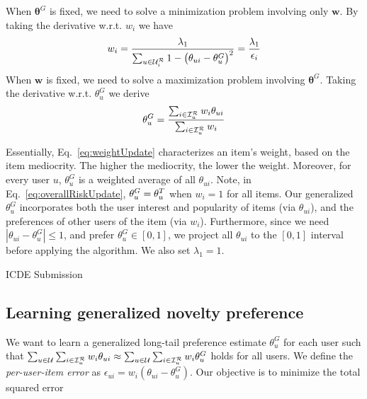 When $\bm{\theta}^G$ is fixed, we need to solve a minimization problem involving only $\mathbf{w}$. By taking the derivative w.r.t. $w_i$ we have  
\begin{align}
w_i = \frac{\lambda_1}{ \sum_{u \in \mathcal{U}_{i}^{\mathcal{R}}} 1 - \big(\theta_{ui} -\theta_u^G\big)^2  } = \frac{\lambda_1}{\epsilon_i}
\label{eq:weightUpdate}
\end{align}
When $\mathbf{w}$ is fixed, we need to solve a maximization problem involving $\bm{\theta}^G$. Taking the derivative w.r.t. $\theta_u^G$ we derive
\begin{align}
\theta_u^G =\frac{\sum_{i \in \mathcal{I}_{u}^{\mathcal{R}}} w_i \theta_{ui}}{\sum_{i \in \mathcal{I}_{u}^{\mathcal{R}}} w_i} 
\label{eq:overallRiskUpdate}
\end{align}

Essentially, Eq.~\ref{eq:weightUpdate} characterizes an item's weight,  based on the item mediocrity. The higher the mediocrity, the lower the weight.  Moreover, for every user $u$, $\theta_u^G$ is a weighted average of all $\theta_{ui}$. Note, in Eq.~\ref{eq:overallRiskUpdate}, $\theta_u^G=\theta_u^{T}$ when $w_i =1$ for all items.  Our generalized $\theta_u^G$ incorporates both the user interest and popularity of items (via $\theta_{ui}$), and  the preferences of other users of the item (via $w_i$). Furthermore, since we need $|\theta_{ui} - \theta_u^G| \leq 1$, and prefer  $\theta_u^G \in [0,1]$, we project all $\theta_{ui}$ to the $  [0,1]$ interval before applying the algorithm. We also set $\lambda_1=1$.

\iffalse ICDE Submission
\subsection{Learning generalized novelty preference}
\label{sec:learning-lt-pref}
We want to learn a  generalized long-tail preference estimate $\theta_u^G$ for each user such that $\sum_{u \in \mathcal{U}} \sum_{i \in \mathcal{I}_{u}^{\mathcal{R}}} w_i \theta_{ui} \approx \sum_{u \in \mathcal{U}} \sum_{i \in \mathcal{I}_{u}^{\mathcal{R}}} w_i \theta_u^G $ holds for all users.  We define the \textit{per-user-item error}  as $\epsilon_{ui} = w_i ( \theta_{ui} - \theta_u^G)$. Our objective is to minimize the total squared error

